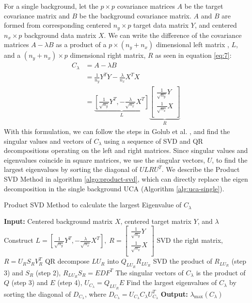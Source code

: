 \documentclass[12pt]{article}
\begin{document}
For a single background, let the $p \times p$ covariance matrices $A$ be the target covariance matrix and $B$ be the background covariance matrix. $A$ and $B$ are formed from corresponding centered $n_y \times p$ target data matrix $Y$,   and centered $n_x \times p$ background data matrix $X$.  We can write the difference of the covariance matrices $A - \lambda B$ as a product of a $p \times (n_y + n_x)$ dimensional left matrix , $L$, and a $(n_y + n_x) \times p$ dimensional right matrix, $R$ as seen in equation \ref{eq:7}:
\begin{align}
C_\lambda &= A - \lambda B \nonumber\\
 &=\frac{1}{n_y}Y^TY -\frac{\lambda}{n_x} X^T X\nonumber \\
 &=  \underbrace{\left[ \frac{1}{\sqrt{n_{y}}}Y^T, - \frac{\lambda}{\sqrt{n_{x}}} X^T\right]}_{L}\underbrace{\begin{bmatrix*} \frac{1}{\sqrt{n_{y}}}Y \\ \frac{1}{\sqrt{n_{x}}}X \\ \end{bmatrix*}}_{R} \label{eq:7}
\end{align}
With this formulation, we can follow the steps in Golub et al.  \cite{Golub}, and find the singular values and vectors of $C_\lambda$ using a sequence of SVD and QR decompositions operating on the left and right matrices. Since singular values and eigenvalues coincide in square matrices, we use the singular vectors, $U$, to find the largest eigenvalues by sorting the diagonal of $ULRU^T$.  
We describe the Product SVD Method in algorithm \ref{algo:product-svd}, which can directly replace the eigen decomposition in the single background UCA (Algorithm \ref{alg:uca-single}).

\begin{algorithm}[ht]
\label{algo:product-svd}
\caption{Product SVD Method to calculate the largest Eigenvalue of $C_\lambda$}
\SetAlgoLined
\textbf{Input:} Centered background matrix $X$, centered target matrix $Y$, and $\lambda$\;
\nl Construct 
$  L = \left[ \frac{1}{\sqrt{n_{y}}}Y^T, - \frac{\lambda}{\sqrt{n_{x}}} X^T\right],\;
   R = \begin{bmatrix*} \frac{1}{\sqrt{n_{y}}}Y \\ \frac{1}{\sqrt{n_{x}}}X \\ \end{bmatrix*} $\;
\nl  SVD the right matrix, $R = U_R S_R V^T_R$ \;
\nl  QR decompose $LU_R$ into  $Q_{LU_R}R_{LU_R}$ \;
\nl  SVD the product of $R_{LU_R}$ (step 3) and $S_R$ (step 2), $R_{LU_R}S_{R} = EDF^T$ \;
\nl  The singular vectors of $C_\lambda$ is the product of $Q$ (step 3) and $E$ (step 4), $U_{C_\lambda} = Q_{LU_R}E$ \;
\nl  Find the largest eigenvalues of $C_\lambda$ by sorting the diagonal of $D_{C_\lambda}$, where $D_{C_\lambda} = U_{C_\lambda} C_\lambda U_{C_\lambda}^T$ \;
\textbf{Output:} $\lambda_{\text{max}}\left( C_\lambda \right)$ 
\end{algorithm}
 
\end{document}

